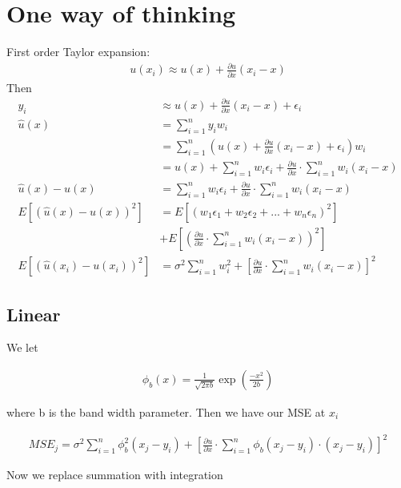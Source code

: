 \documentclass{article}
\begin{document}
\section{One way of thinking}

First order Taylor expansion: 
\begin{align}
  u(x_i) \approx u(x) + \frac{\partial u}{\partial x}(x_i - x) 
\end{align}
Then 
\begin{align}
   y_i &\approx  u(x) + \frac{\partial u}{\partial x}(x_i - x) + \epsilon_i \\ 
    \hat{u}(x) &= \sum_{i=1}^n y_i w_i \\
   &= \sum_{i=1}^n \left( u(x) + \frac{\partial u}{\partial x}(x_i - x) + \epsilon_i \right) w_i \\
   &= u(x) + \sum_{i=1}^n  w_i \epsilon_i +  \frac{\partial u}{\partial x}\cdot \sum_{i=1}^n  w_i(x_i - x) \\ 
   \hat{u}(x) - u(x) &= \sum_{i=1}^n  w_i \epsilon_i +  \frac{\partial u}{\partial x}\cdot \sum_{i=1}^n  w_i(x_i - x) \\ 
     E\left[ \left(\hat{u}(x) - u(x)\right)^2 \right] &=  E\left[ \left(w_1\epsilon_1+w_2\epsilon_2+...+w_n\epsilon_n \right)^2 \right] \\&+  E\left[ \left( \frac{\partial u}{\partial x}\cdot \sum_{i=1}^n  w_i(x_i - x)\right)^2 \right] \\ 
     E\left[ \left(\hat{u}(x_i) - u(x_i)\right)^2 \right] &=  \sigma^2\sum_{i=1}^n  w_i^2  +  \left[ \frac{\partial u}{\partial x}\cdot \sum_{i=1}^n  w_i(x_i - x) \right]^2 
\end{align}


\subsection{Linear}
We let

\begin{align}
    \phi_b (x) = \frac{1}{\sqrt{2 \pi b}}\exp(\frac{-x^2}{2b})
\end{align}

where b is the band width parameter. Then we have our MSE at $x_i$

\begin{align}
   MSE_j =  \sigma^2\sum_{i=1}^n  \phi_b^2(x_j-y_i)  +  \left[ \frac{\partial u}{\partial x}\cdot \sum_{i=1}^n  \phi_b(x_j-y_i)\cdot(x_j - y_i) \right]^2 
\end{align}

Now we replace summation with integration
\end{document}
